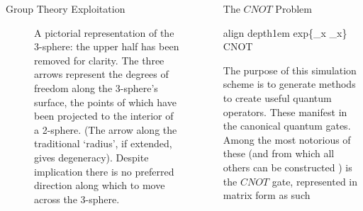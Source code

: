 \documentclass[12pt]{beamer}
\newcommand*\mystrut[1]{\vrule width0pt height0pt depth#1\relax}
\begin{document}
\begin{frame}
\begin{columns}
\begin{column}{.45\textwidth}
\begin{exampleblock}{Group Theory Exploitation}
\begin{figure}[htpb]
		\centering
		\caption{A pictorial representation of the 3-sphere: the upper half has been removed for clarity. The three arrows represent the degrees of freedom along the 3-sphere's surface, the points of which have been projected to the interior of a 2-sphere. (The arrow along the traditional `radius', if extended, gives degeneracy). Despite implication there is no preferred direction along which to move across the 3-sphere.}
	\end{figure}


\end{exampleblock}


					\end{column}
			
			\begin{column}{.45\textwidth}

	
			\begin{exampleblock}{The $CNOT$ Problem}

	\begin{empheq}[box=\fbox]{align}
		\mystrut{1em} exp\{\sigma_x \otimes \sigma_x\} \mapsto CNOT
	\end{empheq}

	The purpose of this simulation scheme is to generate methods to create useful quantum operators. These manifest in the canonical quantum gates. Among the most notorious of these (and from which all others can be constructed \cite{oliviera}) is the $CNOT$ gate, represented in matrix form as such


\end{exampleblock}
\end{column}
\end{columns}
\end{frame}
\end{document}
